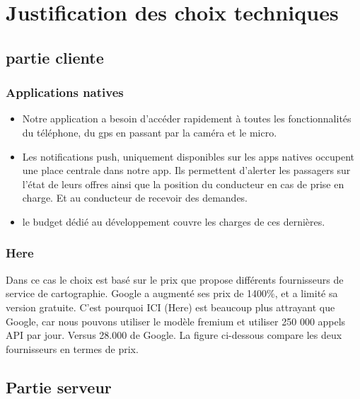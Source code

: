 \section{Justification des choix techniques} %
\label{sec:justification_du_choix_technique}
\subsection{partie cliente} %
\label{sub:partie_cliente}
\subsubsection{Applications natives} %
\label{ssub:application_native}
\begin{itemize}
	\item Notre application a besoin d’accéder rapidement à toutes les fonctionnalités du téléphone, du gps en passant par la caméra et le micro.
	\item Les notifications push, uniquement disponibles sur les apps natives occupent une place centrale dans notre app. Ils permettent d’alerter les passagers sur l'état de leurs offres ainsi que la position du conducteur en cas de prise en charge. Et au conducteur de recevoir des demandes.
	\item le budget dédié au développement couvre les charges de ces dernières.
\end{itemize}

\subsubsection{Here} %
\label{ssub:here}
Dans ce cas le choix est basé sur le prix que propose différents fournisseurs de service de cartographie.\newline
Google a augmenté ses prix de 1400\%, et a limité sa version gratuite. C'est pourquoi ICI (Here) est beaucoup plus attrayant que Google, car nous pouvons utiliser le modèle fremium et utiliser 250 000 appels API par jour. Versus 28.000 de Google.\newline
La figure ci-dessous compare les deux fournisseurs en termes de prix.\cite{heremaps}

\subsection{Partie serveur} %
\label{sub:partie_serveur}

